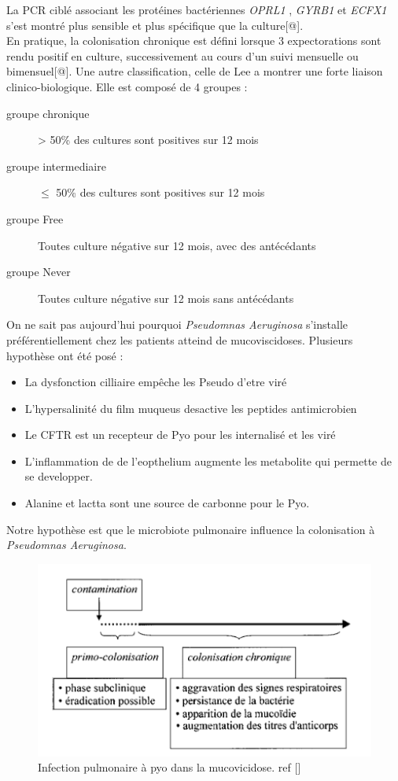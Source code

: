 \documentclass[12pt,a4paper]{article}
\begin{document}
La PCR ciblé associant les protéines bactériennes \textit{OPRL1} , \textit{GYRB1} et \textit{ECFX1}  s’est montré plus sensible et plus spécifique que la culture[@]. \\
En pratique, la colonisation chronique est défini lorsque 3 expectorations sont rendu positif en culture, successivement au cours d’un suivi mensuelle ou bimensuel[@].
Une autre classification, celle de Lee a montrer une forte liaison clinico-biologique. Elle est composé de 4 groupes :  
\begin{description}
\item[groupe chronique] > 50\% des cultures sont positives sur 12 mois
\item[groupe intermediaire] $\leq$ 50\% des cultures sont positives sur  12 mois
\item[groupe Free] Toutes culture négative sur 12 mois, avec des antécédants
\item[groupe Never] Toutes culture négative sur 12 mois sans antécédants 
\end{description}

On ne sait pas aujourd’hui pourquoi \textit{Pseudomnas Aeruginosa} s’installe préférentiellement chez les patients atteind de mucoviscidoses. Plusieurs hypothèse ont été posé : 

\begin{itemize}
\item La dysfonction cilliaire empêche les Pseudo d’etre viré
\item L’hypersalinité du film muqueus desactive les peptides antimicrobien
\item Le CFTR est un recepteur de Pyo pour les internalisé et les viré
\item L’inflammation de de l’eopthelium augmente les metabolite qui permette de se developper.
\item Alanine et lactta sont une source de carbonne pour le Pyo.
\end{itemize}

Notre hypothèse est que le microbiote pulmonaire influence la colonisation à \textit{Pseudomnas Aeruginosa}. 



\begin{figure}[ht]
\begin{center}
\includegraphics[scale=0.8]{img/chronic.png}\hfill
\end{center}
\caption{Infection pulmonaire à pyo dans la mucovicidose. ref []}
\label{bach}
\end{figure}
\end{document}
